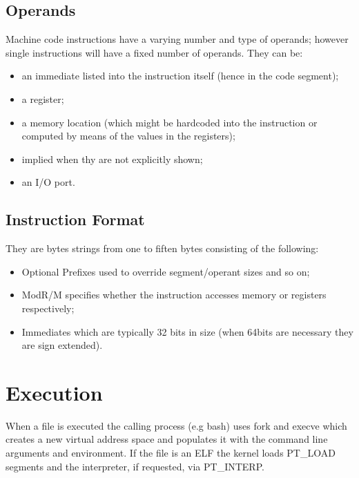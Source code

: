 \subsection{Operands}
Machine code instructions have a varying number and type of operands; however single instructions will have a fixed number of operands. They can be:
\begin{itemize}
    \item an immediate listed into the instruction itself (hence in the code segment);
    \item a register;
    \item a memory location (which might be hardcoded into the instruction or computed by means of the values in the registers);
    \item implied when thy are not explicitly shown;
    \item an I/O port.
\end{itemize}
\subsection{Instruction Format}
They are bytes strings from one to fiften bytes consisting of the following:
\begin{itemize} 
    \item Optional Prefixes used to override segment/operant sizes and so on;
    \item ModR/M specifies whether the instruction accesses memory or registers respectively;
    \item Immediates which are typically 32 bits in size (when 64bits are necessary they are sign extended).
\end{itemize}

\section{Execution}
When a file is executed the calling process (e.g bash) uses {\ttfamily fork} and {\ttfamily execve} which creates a new
virtual address space and populates it with the command line arguments and environment. If the file is an ELF the kernel
loads {\ttfamily PT\_LOAD} segments and the interpreter, if requested, via {\ttfamily PT\_INTERP}.
